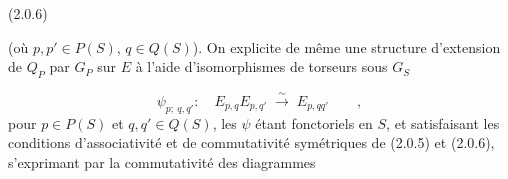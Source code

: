 (2.0.6) 
(où $p,p' \in P(S)$, $q \in Q(S)$). On explicite de même une structure d'extension de $Q_P$ par $G_P$ sur $E$ à l'aide d'isomorphismes de torseurs sous $G_S$

\begin{equation}\tag{2.0.7}
\psi_{p;\ q,q'}: \quad E_{p,q}E_{p,q'} \;\overset{\sim}{\longrightarrow}\; E_{p,qq'} \qquad ,
\end{equation}
pour $p \in P(S)$ et $q,q' \in Q(S)$, les $\psi$ étant fonctoriels en $S$, et satisfaisant les conditions d'associativité et de commutativité symétriques de (2.0.5) et (2.0.6), s'exprimant par la commutativité des diagrammes

